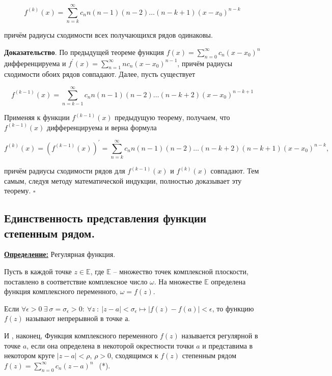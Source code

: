\documentclass[a4paper,12pt]{article} %
\begin{document}
\begin{equation*}
f^{(k)}(x)=\sum\limits_{n=k}^{\infty} c_{n} n(n-1)(n-2) \ldots(n-k+1)\left(x-x_{0}\right)^{n-k}
\end{equation*}

причём радиусы сходимости всех получающихся рядов одинаковы.

\textbf{Доказательство}. По предыдущей теореме функция $f(x)=\sum\limits_{n=0}^{\infty} c_{n}\left(x-x_{0}\right)^{n}$ дифференцируема и $f^{\prime}(x)=\sum\limits_{n=1}^{\infty} n c_{n}\left(x-x_{0}\right)^{n-1}$, причём радиусы сходимости обоих рядов совпадают. Далее, пусть существует

\begin{equation*}
f^{(k-1)}(x)=\sum\limits_{n=k-1}^{\infty} c_{n} n(n-1)(n-2) \ldots(n-k+2)\left(x-x_{0}\right)^{n-k+1}
\end{equation*}

Применяя к функции $f^{(k-1)}(x)$ предыдущую теорему, получаем, что $f^{(k-1)}(x)$ дифференцируема и верна формула

\begin{equation*}
f^{(k)}(x)=\left(f^{(k-1)}(x)\right)^{\prime}=\sum\limits_{n=k}^{\infty} c_{n} n(n-1)(n-2) \ldots(n-k+2)(n-k+1)\left(x-x_{0}\right)^{n-k},
\end{equation*}

причём радиусы сходимости рядов для $f^{(k-1)}(x)$ и $f^{(k)}(x)$ совпадают. Тем самым, следуя методу математической индукции, полностью доказывает эту теорему. $\square$


\subsection{Единственность представления функции степенным рядом.}

\underline{\textbf{Определение:}} Регулярная функция.

Пусть в каждой точке $z \in \mathbb{E}$, где $\mathbb{E}$ -- множество точек комплексной плоскости, поставлено в соответствие комплексное число $\omega$. На множестве $\mathbb{E}$ определена функция комплексного переменного, $\omega = f(z)$.

Если $\forall \epsilon > 0\ \exists \ \sigma = \sigma_{\epsilon} > 0:\ \forall z\ :\ |z - a| < \sigma_{\epsilon} \longmapsto |f(z) - f(a)| < \epsilon$, то функцию $f(z)$ называют непрерывной в точке а.

И , наконец, Функция комплексного переменного $f(z)$ называется регулярной в точке $a$, если она определена в некоторой окрестности точки $a$ и представима в некотором круге $|z - a| < \rho$, $\rho > 0$, сходящимся к $f(z)$ степенным рядом $f(z) = \sum\limits_{n = 0}^{\infty} c_n(z-a)^n\ \ $ (*).\\
\end{document}
